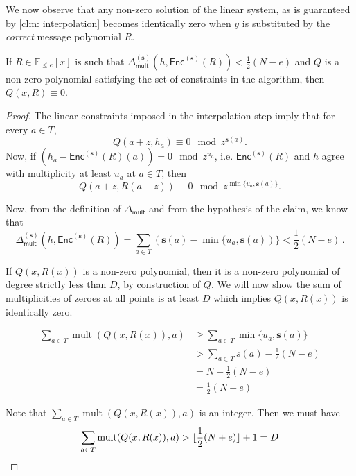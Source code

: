 \documentclass{article}
\def\Field{\mathbb{F}}
\let\F\Field
\newcommand{\enc}{{\mathsf{Enc}}}
\newcommand{\mult}{\operatorname{mult}}
\newcommand{\Delm}{\Delta_{\mathsf{mult}}}
\newcommand{\sbar}{\mathbf{s}}
\begin{document}
	We now observe that any non-zero solution of the linear system, as is
	guaranteed by \autoref{clm: interpolation} becomes identically zero when
	$y$ is substituted by the \emph{correct} message polynomial $R$.
	
	\begin{claim}\label{clm: close enough poly staisfy eqn}
		If $R \in \F_{\leq e}[x]$ is such that $\Delm^{(\sbar)}(h,\enc^{(\sbar)}(R)) < \frac{1}{2}(N - e)$ and $Q$ is a non-zero polynomial satisfying the set of constraints in the algorithm, then $Q(x, R) \equiv 0$.
	\end{claim}
	
	\begin{proof}
		The linear constraints imposed in the interpolation step imply that for every $a \in T$, \[ Q(a + z, h_a) \equiv 0 \mod z^{\sbar(a)}. \]
		Now, if $(h_a - \enc^{(\sbar)}(R)(a)) = 0 \mod z^{u_a}$, i.e. $\enc^{(\sbar)}(R)$ and $h$ agree with multiplicity at least $u_a$ at $a \in T$, then 
		\[ 
		Q(a + z, R(a + z)) \equiv 0 \mod z^{\min\{u_a, \sbar(a)\}}. 
		\]
		
		Now, from the definition of $\Delm$ and from the hypothesis of the claim, we know that
		\[
		\Delm^{(\sbar)}(h,\enc^{(\sbar)}(R)) = \sum_{a \in T} (\sbar(a) - \min\{u_a, \sbar(a))\} < \frac{1}{2}(N-e)\, .
		\]
		
		If $Q(x, R(x))$ is a non-zero polynomial, then it is a non-zero polynomial of degree strictly less than $D$, by construction of $Q$. We will now show the sum of multiplicities of zeroes at all points is at least $D$ which implies $Q(x, R(x))$ is identically zero.
		
		\[
		\begin{split}
			\sum_{a \in T} \mult(Q(x, R(x)), a) & \geq \sum_{a \in T} \min\{u_a, \sbar(a)\} \\
			& > \sum_{a \in T} s(a) - \frac{1}{2} (N-e) \\
			& = N - \frac{1}{2} (N-e) \\
			& = \frac{1}{2}(N+e)
		\end{split}
		\]
		
		Note that $\sum_{a \in T} \mult(Q(x, R(x)), a)$ is an integer. Then we must have 
		\[ \sum_{a \in T} \mult(Q(x, R(x)), a) > \lfloor \frac{1}{2}(N+e) \rfloor +1 = D \qedhere \]
	\end{proof}
	
\end{document}
